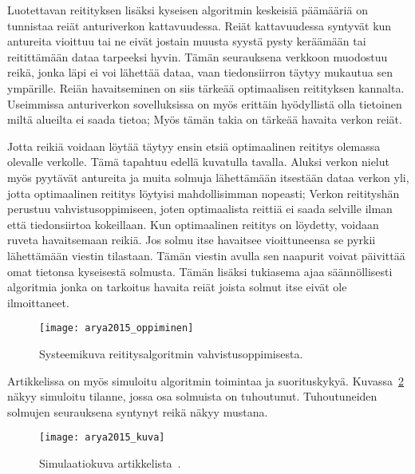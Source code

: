 Luotettavan reitityksen lisäksi kyseisen algoritmin keskeisiä päämääriä on
tunnistaa reiät anturiverkon kattavuudessa. Reiät kattavuudessa syntyvät kun
antureita vioittuu tai ne eivät jostain muusta syystä pysty keräämään tai
reitittämään dataa tarpeeksi hyvin. Tämän seurauksena verkkoon muodostuu
reikä, jonka läpi ei voi lähettää dataa, vaan tiedonsiirron täytyy mukautua
sen ympärille. Reiän havaitseminen on siis tärkeää optimaalisen reitityksen
kannalta. Useimmissa anturiverkon sovelluksissa on myös erittäin hyödyllistä
olla tietoinen miltä alueilta ei saada tietoa; Myös tämän takia on tärkeää
havaita verkon reiät.

Jotta reikiä voidaan löytää täytyy ensin etsiä optimaalinen reititys olemassa
olevalle verkolle. Tämä tapahtuu edellä kuvatulla tavalla. Aluksi verkon nielut
myös pyytävät antureita ja muita solmuja lähettämään itsestään dataa verkon
yli, jotta optimaalinen reititys löytyisi mahdollisimman nopeasti; Verkon
reitityshän perustuu vahvistusoppimiseen, joten optimaalista reittiä ei saada
selville ilman että tiedonsiirtoa kokeillaan. Kun optimaalinen reititys on
löydetty, voidaan ruveta havaitsemaan reikiä. Jos solmu itse havaitsee
vioittuneensa se pyrkii lähettämään viestin tilastaan. Tämän viestin avulla sen
naapurit voivat päivittää omat tietonsa kyseisestä solmusta. Tämän lisäksi
tukiasema ajaa säännöllisesti algoritmia jonka on tarkoitus havaita reiät
joista solmut itse eivät ole ilmoittaneet.

\begin{figure}[h]
  \centering
  \texttt{[image: arya2015\_oppiminen]}
  \caption{Systeemikuva reititysalgoritmin vahvistusoppimisesta.~\parencite{Arya2015}}
\label{fig:arya2015_oppiminen}
\end{figure}

Artikkelissa on myös simuloitu algoritmin toimintaa ja suorituskykyä.
Kuvassa~\ref{fig:arya2015} näkyy simuloitu tilanne, jossa osa solmuista on
tuhoutunut. Tuhoutuneiden solmujen seurauksena syntynyt reikä näkyy mustana.

\begin{figure}[h]
  \centering
  \texttt{[image: arya2015\_kuva]}
  \caption{Simulaatiokuva artikkelista~\cite{Arya2015}.}
\label{fig:arya2015}
\end{figure}


